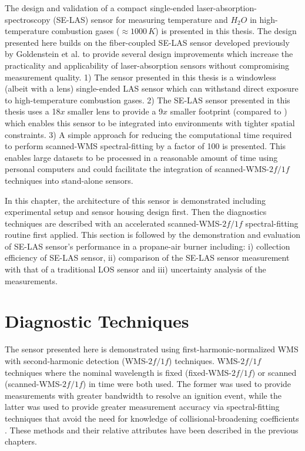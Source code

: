The design and validation of a compact single-ended laser-absorption-spectroscopy (SE-LAS) sensor for measuring temperature and $H_2O$ in high-temperature combustion gases ($\approx 1000\,K$) is presented in this thesis. The design presented here builds on the fiber-coupled SE-LAS sensor developed previously by Goldenstein et al. \cite{Goldenstein:16} to provide several design improvements which increase the practicality and applicability of laser-absorption sensors without compromising measurement quality. 1) The sensor presented in this thesis is a windowless (albeit with a lens) single-ended LAS sensor which can withstand direct exposure to high-temperature combustion gases. 2) The SE-LAS sensor presented in this thesis uses a 18$x$ smaller lens to provide a 9$x$ smaller footprint (compared to \cite{Goldenstein:16}) which enables this sensor to be integrated into environments with tighter spatial constraints. 3) A simple approach for reducing the computational time required to perform scanned-WMS spectral-fitting by a factor of 100 is presented. This enables large datasets to be processed in a reasonable amount of time using personal computers and could facilitate the integration of scanned-WMS-$2f/1f$ techniques into stand-alone sensors.

In this chapter, the architecture of this sensor is demonstrated including experimental setup and sensor housing design first. Then the diagnostics techniques are described with an accelerated scanned-WMS-$2f/1f$ spectral-fitting routine first applied. This section is followed by the demonstration and evaluation of SE-LAS sensor's performance in a propane-air burner including: i) collection efficiency of SE-LAS sensor, ii) comparison of the SE-LAS sensor measurement with that of a traditional LOS sensor and iii) uncertainty analysis of the measurements.

\section{Diagnostic Techniques}
The sensor presented here is demonstrated using first-harmonic-normalized WMS with second-harmonic detection (WMS-$2f/1f$) techniques. WMS-$2f/1f$ techniques where the nominal wavelength is fixed (fixed-WMS-$2f/1f$) or scanned (scanned-WMS-$2f/1f$) in time were both used. The former was used to provide measurements with greater bandwidth to resolve an ignition event, while the latter was used to provide greater measurement accuracy via spectral-fitting techniques that avoid the need for knowledge of collisional-broadening coefficients \cite{Goldenstein2014}. These methods and their relative attributes have been described in the previous chapters.

